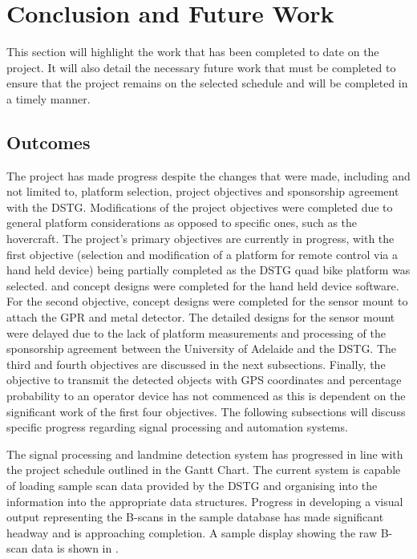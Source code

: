 \documentclass[main.tex]{subfiles}
\begin{document}
\chapter{Conclusion and Future Work}
This section will highlight the work that has been completed to date on the project. It will also detail the necessary future work that must be completed to ensure that the project remains on the selected schedule and will be completed in a timely manner.
\section{Outcomes}

The project has made progress despite the changes that were made, including and not limited to, platform selection, project objectives and sponsorship agreement with the DSTG. Modifications of the project objectives were completed due to general platform considerations as opposed to specific ones, such as the hovercraft. The project's primary objectives are currently in progress, with the first objective (selection and modification of a platform for remote control via a hand held device) being partially completed as the DSTG quad bike platform was selected. and concept designs were completed for the hand held device software. For the second objective, concept designs were completed for the sensor mount to attach the GPR and metal detector. The detailed designs for the sensor mount were delayed due to the lack of platform measurements and processing of the sponsorship agreement between the University of Adelaide and the DSTG. The third and fourth objectives are discussed in the next subsections. Finally, the objective to transmit the detected objects with GPS coordinates and percentage probability to an operator device has not commenced as this is dependent on the significant work of the first four objectives. The following subsections will discuss specific progress regarding signal processing and automation systems.

The signal processing and landmine detection system has progressed in line with the project schedule outlined in the Gantt Chart. The current system is capable of loading sample scan data provided by the DSTG and organising into the information into the appropriate data structures. 
Progress in developing a visual output representing the B-scans in the sample database has made significant headway and is approaching completion. A sample display showing the raw B-scan data is shown in .
\end{document}
